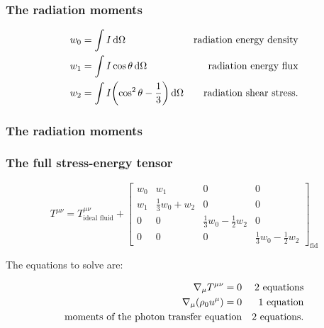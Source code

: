 \documentclass{beamer}
\begin{document}
\begin{frame}
    \frametitle{The radiation moments}

    \begin{subequations}
    \begin{align*}
      w_0 &= \int I \dd{\Omega} & \text{radiation energy density} \\
      w_1 &= \int I \cos \theta \dd{\Omega} & \text{radiation energy flux} \\
      w_2 &= \int I \qty(\cos^2 \theta - \frac{1}{3}) \dd{\Omega} & \text{radiation shear stress.}
    \end{align*}
    \end{subequations}
\end{frame}

\begin{frame}
    \frametitle{The radiation moments}

\end{frame}

\begin{frame}
    \frametitle{The full stress-energy tensor}

    \begin{equation*}
    T^{\mu\nu} =
    T^{\mu\nu}_{\text{ideal fluid}} +
    \begin{bmatrix}
    w_0   & w_1  & 0  & 0 \\
    w_1   & \frac{1}{3}w_0 + w_2  &  0  & 0 \\
      0 & 0  &  \frac{1}{3}w_0 -\frac{1}{2}w_2 & 0 \\
      0 & 0  &  0 & \frac{1}{3}w_0 -\frac{1}{2}w_2
    \end{bmatrix} _{\text{fid}}
    \end{equation*}

    The equations to solve are:

    \begin{subequations}
    \begin{align*}
      \nabla_\mu T^{\mu\nu} = 0 && \text{2 equations} \\
      \nabla_\mu \qty(\rho_0 u^\mu) = 0&& \text{1 equation} \\
      \text{moments of the photon transfer equation} && \text{2 equations.}
    \end{align*}
    \end{subequations}
\end{frame}
\end{document}
